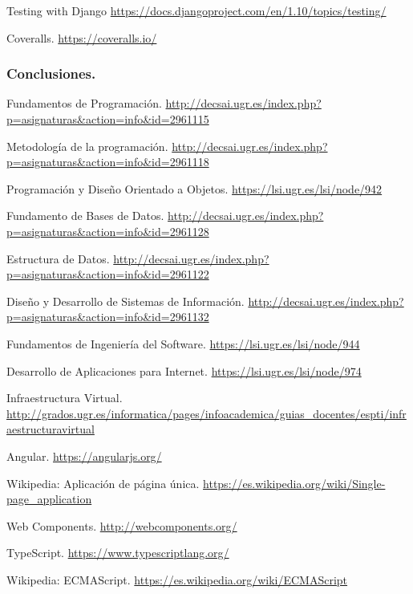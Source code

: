  Testing with Django \url{https://docs.djangoproject.com/en/1.10/topics/testing/}

 Coveralls. \url{https://coveralls.io/}

\subsubsection*{Conclusiones.}

 Fundamentos de Programación. \url{http://decsai.ugr.es/index.php?p=asignaturas&action=info&id=2961115}

 Metodología de la programación. \url{http://decsai.ugr.es/index.php?p=asignaturas&action=info&id=2961118}

 Programación y Diseño Orientado a Objetos. \url{https://lsi.ugr.es/lsi/node/942}

 Fundamento de Bases de Datos. \url{http://decsai.ugr.es/index.php?p=asignaturas&action=info&id=2961128}

 Estructura de Datos. \url{http://decsai.ugr.es/index.php?p=asignaturas&action=info&id=2961122}

 Diseño y Desarrollo de Sistemas de Información. \url{http://decsai.ugr.es/index.php?p=asignaturas&action=info&id=2961132}

 Fundamentos de Ingeniería del Software. \url{https://lsi.ugr.es/lsi/node/944}

 Desarrollo de Aplicaciones para Internet. \url{https://lsi.ugr.es/lsi/node/974}

 Infraestructura Virtual. \url{http://grados.ugr.es/informatica/pages/infoacademica/guias_docentes/espti/infraestructuravirtual} 

 Angular. \url{https://angularjs.org/}

 Wikipedia: Aplicación de página única. \url{https://es.wikipedia.org/wiki/Single-page_application}

 Web Components. \url{http://webcomponents.org/}

 TypeScript. \url{https://www.typescriptlang.org/}

 Wikipedia: ECMAScript. \url{https://es.wikipedia.org/wiki/ECMAScript}

